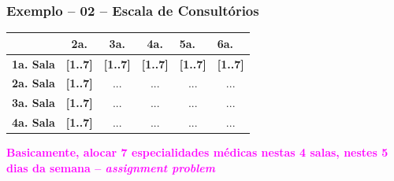\documentclass{beamer}
\begin{document}
\begin{frame}[fragile] 

\frametitle{Exemplo -- 02 -- Escala de Consultórios}



\begin{table}[]
\begin{tabular}{|c|c|c|c|c|c|}
\hline
{\color[HTML]{00009B} }                                 & {\color[HTML]{CB0000} \textbf{2a.}}                             & {\color[HTML]{CB0000} \textbf{3a.}}        & {\color[HTML]{CB0000} \textbf{4a.}}        & \multicolumn{1}{l|}{{\color[HTML]{CB0000} \textbf{5a.}}}        & \multicolumn{1}{l|}{{\color[HTML]{CB0000} \textbf{6a.}}}        \\ \hline
{\color[HTML]{303498} \textbf{1a. Sala}}                       & {\color[HTML]{009901} \textbf{{[}1..7{]}}}                      & {\color[HTML]{009901} \textbf{{[}1..7{]}}} & {\color[HTML]{009901} \textbf{{[}1..7{]}}} & \multicolumn{1}{l|}{{\color[HTML]{009901} \textbf{{[}1..7{]}}}} & \multicolumn{1}{l|}{{\color[HTML]{009901} \textbf{{[}1..7{]}}}} \\ \hline
{\color[HTML]{303498} \textbf{2a. Sala}}                       & {\color[HTML]{009901} \textbf{{[}1..7{]}}}                      & ...                                        & ...                                        & ...                                                             & ...                                                             \\ \hline
{\color[HTML]{303498} \textbf{3a. Sala}}                       & {\color[HTML]{009901} \textbf{{[}1..7{]}}}                      & ...                                        & ...                                        & ...                                                             & ...                                                             \\ \hline
\multicolumn{1}{|l|}{{\color[HTML]{303498} \textbf{4a. Sala}}} & \multicolumn{1}{l|}{{\color[HTML]{009901} \textbf{{[}1..7{]}}}} & ...                                        & ...                                        & ...                                                             & ...                                                             \\ \hline
\end{tabular}

\end{table}
{\bf \textcolor{magenta}{Basicamente, alocar 7 especialidades médicas nestas 4 salas, nestes 5 dias da semana -- {\em assignment problem}}}



\end{frame}
\end{document}
